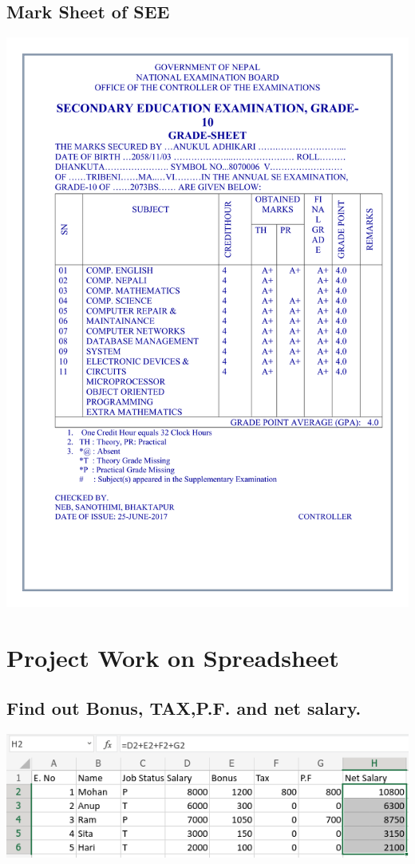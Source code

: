 \documentclass[17pt,a4paper,oneside,margin=1in]{article}
\begin{document}
\subsection{Mark Sheet of SEE}
\includegraphics[width=1.2\textwidth]{./scrot/see.png}
\pagebreak

\section{Project Work on Spreadsheet}
\subsection{Find out Bonus, TAX,P.F. and net salary.}
\includegraphics[width=1\textwidth]{./scrot/spreadsheet-1.png}
\end{document}
